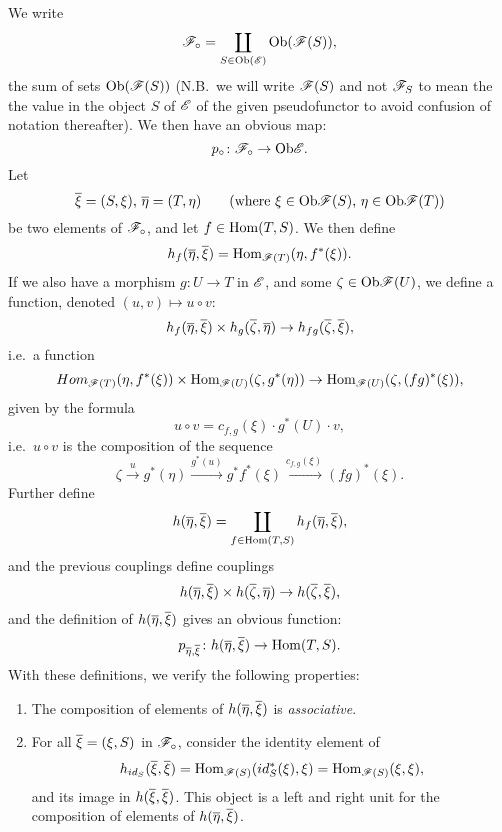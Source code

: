 We write 
\[\mathscr{F}_\circ = \coprod_{S \in \mathrm{Ob} (\mathscr{E})} \mathrm{Ob}(\mathscr{F}(S)),\] 
the sum of sets $\mathrm{Ob}(\mathscr{F} (S))$ (N.B.\ we will write $\mathscr{F}(S)$ and not $\mathscr{F}_S$ to mean the the value in the object $S$ of $\mathscr{E}$ of the given pseudofunctor to avoid confusion of notation thereafter).
We then have an obvious map:
\[p_\circ \colon \mathscr{F}_\circ \to \mathrm{Ob} \mathscr{E}.\]
Let 
\[\overline \xi = (S, \xi), \, \overline \eta = (T, \eta) \qquad (\text{where } \xi \in \mathrm{Ob} \mathscr{F}(S), \, \eta \in \mathrm{Ob} \mathscr{F}(T))\]
be two elements of $\mathscr{F}_\circ$, and let $f \in \mathrm{Hom}(T,S)$.
We then define
\[h_f(\overline \eta, \overline \xi) = \mathrm{Hom}_{\mathscr{F}(T)}(\eta, f^\ast(\xi)).\]
If we also have a morphism $g \colon U \to T$ in $\mathscr{E}$, and some $\zeta \in \mathrm{Ob} \mathscr{F} (U)$, we define a function, denoted $(u,v) \mapsto u \circ v$:
\[h_f(\overline \eta, \overline \xi) \times h_g(\overline \zeta, \overline \eta) \to h_{fg}(\overline \zeta, \overline \xi),\]
i.e.\ a function
\[Hom_{\mathscr{F}(T)} (\eta, f^\ast(\xi)) \times \mathrm{Hom}_{\mathscr{F}(U)} (\zeta, g^\ast(\eta)) \to \mathrm{Hom}_{\mathscr{F}(U)} (\zeta, (fg)^\ast(\xi)),\]
given by the formula
\[u \circ v = c_{f,g} (\xi) \cdot g^\ast(U) \cdot v,\]
i.e.\ $u \circ v$ is the composition of the sequence 
\[
\zeta \xrightarrow{u} g^\ast(\eta) \xrightarrow{g^\ast(u)} g^\ast f^\ast(\xi) \xrightarrow{c_{f,g}(\xi)} (fg)^\ast(\xi).\]
Further define
\[
    h(\overline \eta, \overline \xi) = \coprod_{f \in \mathrm{Hom}(T,S)} h_f(\overline \eta, \overline \xi),
\]
and the previous couplings define couplings
\[h(\overline \eta, \overline \xi) \times h(\overline \zeta, \overline \eta) \to h(\overline \zeta, \overline \xi),\]
and the definition of $h (\overline \eta, \overline \xi)$ gives an obvious function:
\[p_{\overline \eta, \overline \xi}
\colon h(\overline \eta, \overline \xi) \to \mathrm{Hom}(T, S).\]
With these definitions, we verify the following properties:
\begin{enumerate}
    \item {}The composition of elements of $h (\overline \eta, \overline \xi)$ is \emph{associative}.
    \item For all $\overline \xi = (\xi, S)$ in $\mathscr{F}_\circ$, consider the identity element of
    \[h_{id_S} (\overline \xi, \overline \xi) = \mathrm{Hom}_{\mathscr{F}(S)} (id_S^\ast(\xi), \xi) = \mathrm{Hom}_{\mathscr{F}(S)}(\xi,\xi),\]
    and its image in $h (\overline \xi,\overline \xi)$.
        This object is a left and right unit for the composition of elements of $h (\overline \eta, \overline \xi)$.
\end{enumerate}

